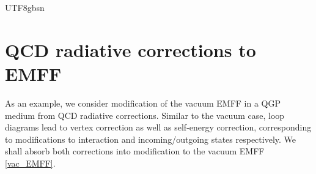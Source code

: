 \documentclass[11pt]{article}\def\baselinestretch{1.4}
\begin{document}
\begin{CJK}{UTF8}{gbsn}
\section{QCD radiative corrections to EMFF}\label{sec_4}

As an example, we consider modification of the vacuum EMFF in a QGP medium from QCD radiative corrections. Similar to the vacuum case, loop diagrams lead to vertex correction as well as self-energy correction, corresponding to modifications to interaction and incoming/outgoing states respectively. We shall absorb both corrections into modification to the vacuum EMFF \eqref{vac_EMFF}.
%


\end{CJK}
\end{document}
